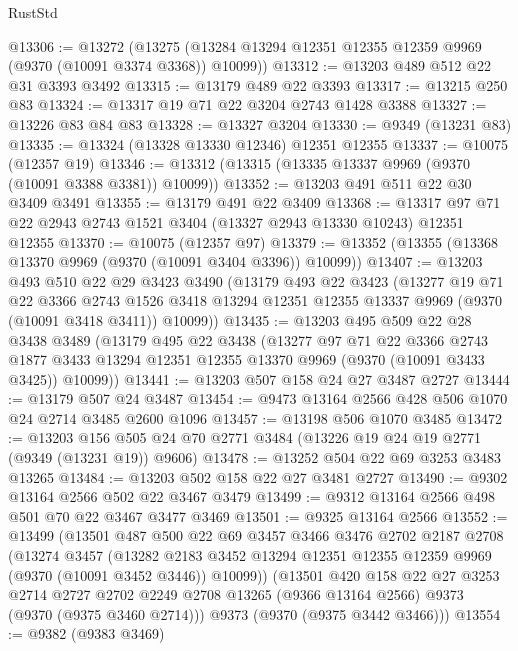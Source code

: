 \begin{lexlean}{RustStd}
\begin{coremodule}
{\begin{coremodule}
{{{{{{{{{{{{{{{{{{{{{{{{{{{{{{{{{{{{{{{@13306 := @13272
    (@13275 (@13284 @13294 @12351 @12355 @12359 @9969 (@9370 (@10091 @3374 @3368)) @10099))
@13312 := @13203 @489 @512 @22 @31 @3393 @3492
@13315 := @13179 @489 @22 @3393
@13317 := @13215 @250 @83
@13324 := @13317 @19 @71 @22 @3204 @2743 @1428 @3388
@13327 := @13226 @83 @84 @83
@13328 := @13327 @3204
@13330 := @9349 (@13231 @83)
@13335 := @13324 (@13328 @13330 @12346) @12351 @12355
@13337 := @10075 (@12357 @19)
@13346 := @13312 (@13315 (@13335 @13337 @9969 (@9370 (@10091 @3388 @3381)) @10099))
@13352 := @13203 @491 @511 @22 @30 @3409 @3491
@13355 := @13179 @491 @22 @3409
@13368 := @13317 @97 @71 @22 @2943 @2743 @1521 @3404 (@13327 @2943 @13330 @10243) @12351 @12355
@13370 := @10075 (@12357 @97)
@13379 := @13352 (@13355 (@13368 @13370 @9969 (@9370 (@10091 @3404 @3396)) @10099))
@13407 := @13203
    @493
    @510
    @22
    @29
    @3423
    @3490
    (@13179
      @493
      @22
      @3423
      (@13277
        @19
        @71
        @22
        @3366
        @2743
        @1526
        @3418
        @13294
        @12351
        @12355
        @13337
        @9969
        (@9370 (@10091 @3418 @3411))
        @10099))
@13435 := @13203
    @495
    @509
    @22
    @28
    @3438
    @3489
    (@13179
      @495
      @22
      @3438
      (@13277
        @97
        @71
        @22
        @3366
        @2743
        @1877
        @3433
        @13294
        @12351
        @12355
        @13370
        @9969
        (@9370 (@10091 @3433 @3425))
        @10099))
@13441 := @13203 @507 @158 @24 @27 @3487 @2727
@13444 := @13179 @507 @24 @3487
@13454 := @9473 @13164 @2566 @428 @506 @1070 @24 @2714 @3485 @2600 @1096
@13457 := @13198 @506 @1070 @3485
@13472 := @13203 @156 @505 @24 @70 @2771 @3484 (@13226 @19 @24 @19 @2771 (@9349 (@13231 @19)) @9606)
@13478 := @13252 @504 @22 @69 @3253 @3483 @13265
@13484 := @13203 @502 @158 @22 @27 @3481 @2727
@13490 := @9302 @13164 @2566 @502 @22 @3467 @3479
@13499 := @9312 @13164 @2566 @498 @501 @70 @22 @3467 @3477 @3469
@13501 := @9325 @13164 @2566
@13552 := @13499
    (@13501
      @487
      @500
      @22
      @69
      @3457
      @3466
      @3476
      @2702
      @2187
      @2708
      (@13274
        @3457
        (@13282 @2183 @3452 @13294 @12351 @12355 @12359 @9969 (@9370 (@10091 @3452 @3446)) @10099))
      (@13501
        @420
        @158
        @22
        @27
        @3253
        @2714
        @2727
        @2702
        @2249
        @2708
        @13265
        (@9366 @13164 @2566)
        @9373
        (@9370 (@9375 @3460 @2714)))
      @9373
      (@9370 (@9375 @3442 @3466)))
@13554 := @9382 (@9383 @3469)
}}}}}}}}}}}}}}}}}}}}}}}}}}}}}}}}}}}}}}}
\end{coremodule}}
\end{coremodule}
\end{lexlean}
